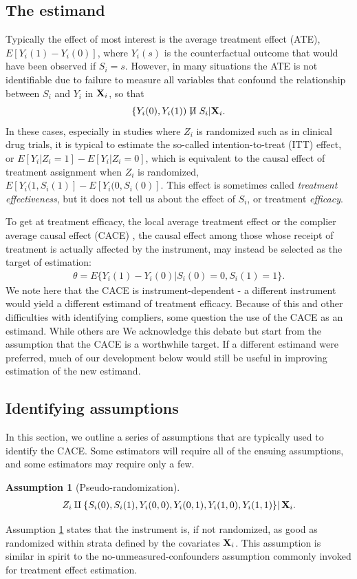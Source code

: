 \documentclass{article}
\newtheorem{assumption}{Assumption}
\begin{document}
\subsection{The estimand}
Typically the effect of most interest is the average treatment effect (ATE), $E[Y_i(1) - Y_i(0)]$, where $Y_i(s)$ is the counterfactual outcome that would have been observed if $S_i = s$. However, in many situations the ATE is not identifiable due to failure to measure all variables that confound the relationship between $S_i$ and $Y_i$ in ${\bf X}_i$, so that 
\[
\{Y_i(0), Y_i(1)) \centernot\amalg S_i | \bX_i.
\]
In these cases, especially in studies where $Z_i$ is randomized such as in clinical drug trials, it is typical to estimate the so-called intention-to-treat (ITT) effect, or $E[Y_i | Z_i = 1] - E[Y_i | Z_i = 0]$, which is equivalent to the causal effect of treatment assignment when $Z_i$ is randomized, $E[Y_i(1, S_i(1)] - E[Y_i(0, S_i(0)]$. This effect is sometimes called \textit{treatment effectiveness}, but it does not tell us about the effect of $S_i$, or treatment \textit{efficacy}. 

To get at treatment efficacy, the local average treatment effect \citep{Angrist1995} or the complier average causal effect (CACE) \citep{Little2018}, the causal effect among those whose receipt of treatment is actually affected by the instrument, may instead be selected as the target of estimation:
\begin{align}
\theta = E\{Y_i(1) - Y_i(0) | S_i(0) = 0, S_i(1) = 1\}. \label{cace}
\end{align}
We note here that the CACE is instrument-dependent - a different instrument would yield a different estimand of treatment efficacy. Because of this and other difficulties with identifying compliers, some \citep{} question the use of the CACE as an estimand. While others are  We acknowledge this debate but start from the assumption that the CACE is a worthwhile target. If a different estimand were preferred, much of our development below would still be useful in improving estimation of the new estimand.


\subsection{Identifying assumptions}
In this section, we outline a series of assumptions that are typically used to identify the CACE. Some estimators will require all of the ensuing assumptions, and some estimators may require only a few. 
\begin{assumption}[Pseudo-randomization] \label{iv_randomized}
    \begin{align*}
    \left.Z_i \amalg \left\{S_i(0), S_i(1), Y_i(0, 0), Y_i(0, 1), Y_i(1, 0), Y_i(1, 1)\right\}\right|{\bf X}_i.    
    \end{align*}
\end{assumption}
Assumption \ref{iv_randomized} states that the instrument is, if not randomized, as good as randomized \citep{imbens2014instrumental} within strata defined by the covariates ${\bf X}_i$. This assumption is similar in spirit to the no-unmeasured-confounders assumption commonly invoked for treatment effect estimation. 
\end{document}
